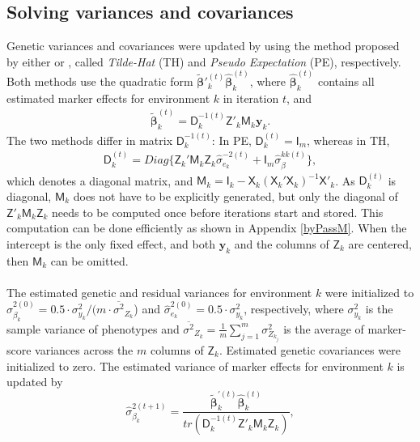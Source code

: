 \documentclass{bmcart}
\newcommand{\vecx}{\boldsymbol}
\newcommand{\mat}[1]{\boldsymbol{\mathsf{#1}}}
\begin{document}
\subsection{Solving variances and covariances}
Genetic variances and covariances were updated by using the method proposed by either \cite{VanRaden} or \cite{Schaeffer}, called \textsl{Tilde-Hat} (TH) and \textsl{Pseudo Expectation} (PE), respectively. Both methods use the quadratic form $\tilde{\vecx{\beta}}'^{(t)}_k\hat{\vecx{\beta}}^{(t)}_k$, 
where $\hat{\vecx{\beta}}^{(t)}_k$ contains all estimated marker effects for environment $k$ in iteration $t$, and
\begin{align}\label{BetaTilde}
 \tilde{\vecx{\beta}}^{(t)}_k = \mat{D}^{-1(t)}_k\mat{Z}'_k \mat{M}_{k} \vecx{y}_k.
\end{align}
The two methods differ in matrix $\mat{D}^{-1(t)}_k$: In PE, $\mat{D}^{(t)}_k = \mat{I}_m$, whereas in TH,
\begin{align}\label{MatrixD}
\mat{D}^{(t)}_k = Diag\{\mat{Z}_k'\mat{M}_k \mat{Z}_k\hat{\sigma}^{-2(t)}_{e_k}+\mat{I}_m\hat{\sigma}^{kk(t)}_{\beta}\},
\end{align}
which denotes a diagonal matrix, and $\mat{M}_{k}=\mat{I}_k-\mat{X}_{k} ( \mat{X}_{k}'\mat{X}_{k})^{-1} \mat{X}'_{k}$. As $\mat{D}^{(t)}_k$ is diagonal, $\mat{M}_{k}$ does not have to be explicitly generated, but only the diagonal
of $\mat{Z}'_{k} \mat{M}_{k} \mat{Z}_{k}$ needs to be computed once before iterations start and stored. This computation can be done efficiently as shown in Appendix \ref{byPassM}. When the intercept is the only fixed effect, and both $\vecx{y}_k$ and the columns of $\mat{Z}_k$ are centered, then $\mat{M}_k$ can be omitted.
\\\\
The estimated genetic and residual variances for environment $k$ were initialized to $\hat{\sigma}^{2(0)}_{\beta_k} = 0.5\cdot\sigma^2_{y_k}/(m\cdot\overline{\sigma^2}_{Z_k}$)
and $\hat{\sigma}^{2(0)}_{e_k} = 0.5\cdot\sigma^2_{y_k}$, respectively, where $\sigma^2_{y_k}$ is the sample variance of phenotypes and $\overline{\sigma^2}_{Z_k} = \frac{1}{m}\sum^m_{j=1}\sigma^2_{Z_{k_j}}$ is the average of marker-score variances across the $m$ columns of $\mat{Z}_k$. Estimated genetic covariances were initialized to zero. The estimated variance of marker effects for environment $k$ is updated by
\begin{equation}
\label{eqn:SigmaBk}
\hat{\sigma}^{2(t+1)}_{\beta_k} = \frac{\tilde{\vecx{\beta}}^{'(t)}_k\hat{\vecx{\beta}}^{(t)}_k}{tr(\mat{D}^{-1(t)}_k \mat{Z}'_k \mat{M}_{k} \mat{Z}_k)},
\end{equation}
\end{document}
